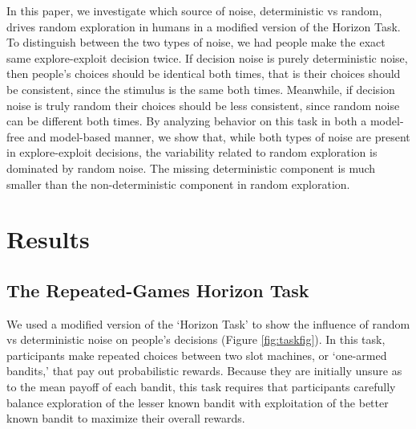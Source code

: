\documentclass[12pt]{article}
\begin{document}
	
	
	
	In this paper, we investigate which source of noise, deterministic vs random, drives random exploration in humans in a modified version of the Horizon Task. To distinguish between the two types of noise, we had people make the exact same explore-exploit decision twice. If decision noise is purely deterministic noise, then people's choices should be identical both times, that is their choices should be consistent, since the stimulus is the same both times. Meanwhile, if decision noise is truly random their choices should be less consistent, since random noise can be different both times. By analyzing behavior on this task in both a model-free and model-based manner, we show that, while both types of noise are present in explore-exploit decisions, the variability related to random exploration is dominated by random noise. The missing deterministic component is much smaller than the non-deterministic component in random exploration.
	
	\section*{Results}
	
	\subsection*{The Repeated-Games Horizon Task}
	We used a modified version of the `Horizon Task' \citep{wilson2014} to show the influence of random vs deterministic noise on people's decisions (Figure \ref{fig:taskfig}). In this task, participants make repeated choices between two slot machines, or `one-armed bandits,' that pay out probabilistic rewards. Because they are initially unsure as to the mean payoff of each bandit, this task requires that participants carefully balance exploration of the lesser known bandit with exploitation of the better known bandit to maximize their overall rewards. 
	
\end{document}

